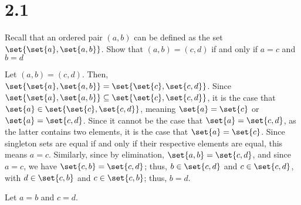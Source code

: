 \documentclass[10pt]{mypackage}
\begin{document}
\RaggedRight
\section{2.1}%
\begin{problem}
  \normalsize
  Recall that an ordered pair $(a,b)$ can be defined as the set $\set{\set{a},\set{a,b}}$. Show that $(a,b) = (c,d)$ if and only if $a=c$ and $b=d$
\end{problem}
\begin{solution}
  Let $(a,b) = (c,d)$. Then, $\set{\set{a},\set{a,b}} = \set{\set{c},\set{c,d}}$. Since $\set{\set{a},\set{a,b}}\subseteq \set{\set{c},\set{c,d}}$, it is the case that $\set{a}\in \set{\set{c},\set{c,d}}$, meaning $\set{a} = \set{c}$ or $\set{a} = \set{c,d}$. Since it cannot be the case that $\set{a} = \set{c,d}$, as the latter contains two elements, it is the case that $\set{a} = \set{c}$. Since singleton sets are equal if and only if their respective elements are equal, this means $a = c$. Similarly, since by elimination, $\set{a,b} = \set{c,d}$, and since $a = c$, we have $\set{c,b} = \set{c,d}$; thus, $b\in \set{c,d}$ and $c \in \set{c,d}$, with $d\in \set{c,b}$ and $c\in \set{c,b}$; thus, $b = d$.\newline

  Let $a=b$ and $c=d$. %
\end{solution}
\end{document}
